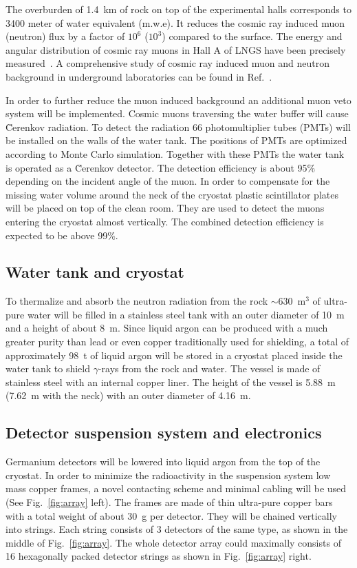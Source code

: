The overburden of 1.4~km of rock on top of the experimental halls corresponds to 3400 meter of water equivalent (m.w.e). It reduces the cosmic ray induced muon (neutron) flux by a factor of $10^{6}$ ($10^{3}$) compared to the surface. The energy and angular distribution of cosmic ray muons in Hall A of LNGS have been precisely measured~\cite{Amb95, Lip91, Amb03}. A comprehensive study of cosmic ray induced muon and neutron background in underground laboratories can be found in Ref.~\cite{Mei06}.

In order to further reduce the muon induced background an additional muon veto system will be implemented. Cosmic muons traversing the water buffer will cause \u{C}erenkov radiation. To detect the radiation 66 photomultiplier tubes (PMTs) will be installed on the walls of the water tank. The positions of PMTs are optimized according to Monte Carlo simulation. Together with these PMTs the water tank is operated as a \u{C}erenkov detector. The detection efficiency is about 95\% depending on the incident angle of the muon. In order to compensate for the missing water volume around the neck of the cryostat plastic scintillator plates will be placed on top of the clean room. They are used to detect the muons entering the cryostat almost vertically. The combined detection efficiency is expected to be above 99\%.

\subsection{Water tank and cryostat}
\label{sec:gerda:rock}
To thermalize and absorb the neutron radiation from the rock $\sim 630$~m$^{3}$ of ultra-pure water will be filled in a stainless steel tank with an outer diameter of 10~m and a height of about 8~m. Since liquid argon can be produced with a much greater purity than lead or even copper traditionally used for shielding, a total of approximately 98~t of liquid argon will be stored in a cryostat placed inside the water tank to shield $\gamma$-rays from the rock and water. The vessel is made of stainless steel with an internal copper liner. The height of the vessel is 5.88~m (7.62~m with the neck) with an outer diameter of 4.16~m.

\subsection{Detector suspension system and electronics}
\label{sec:gerda:cable}
Germanium detectors will be lowered into liquid argon from the top of the cryostat. In order to minimize the radioactivity in the suspension system low mass copper frames, a novel contacting scheme and minimal cabling will be used (See Fig.~\ref{fig:array} left). The frames are made of thin ultra-pure copper bars with a total weight of about 30~g per detector. They will be chained vertically into strings. Each string consists of 3 detectors of the same type, as shown in the middle of Fig.~\ref{fig:array}. The whole detector array could maximally consists of 16 hexagonally packed detector strings as shown in Fig.~\ref{fig:array} right. 

